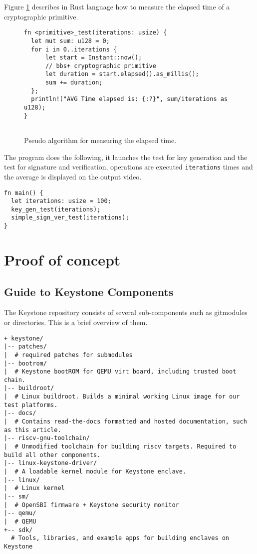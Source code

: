 Figure \ref{bbs-pseudo-algo} describes in Rust language how to measure the elapsed time of a cryptographic primitive. \\
\begin{figure}[H]
\begin{lstlisting}[frame=single]
fn <primitive>_test(iterations: usize) {
  let mut sum: u128 = 0;
  for i in 0..iterations {
      let start = Instant::now();
      // bbs+ cryptographic primitive
      let duration = start.elapsed().as_millis();
      sum += duration;
  };
  println!("AVG Time elapsed is: {:?}", sum/iterations as u128);
}
    
\end{lstlisting}
\caption{Pseudo algorithm for measuring the elapsed time.}
\label{bbs-pseudo-algo}
\end{figure}
The program does the following, it launches the test for key generation and the test for signature and verification, operations are executed \texttt{iterations} times and the average is displayed on the output video.  \\
\begin{lstlisting}[frame=single]
fn main() {
  let iterations: usize = 100;
  key_gen_test(iterations);
  simple_sign_ver_test(iterations);
}
\end{lstlisting}


\newpage
\section{Proof of concept}
\subsection{Guide to Keystone Components}
The Keystone repository consists of several sub-components such as gitmodules or directories. This is a brief overview of them. \\
\begin{lstlisting}[frame=single]
+ keystone/
|-- patches/
|  # required patches for submodules
|-- bootrom/
|  # Keystone bootROM for QEMU virt board, including trusted boot chain.
|-- buildroot/
|  # Linux buildroot. Builds a minimal working Linux image for our test platforms.
|-- docs/
|  # Contains read-the-docs formatted and hosted documentation, such as this article.
|-- riscv-gnu-toolchain/
|  # Unmodified toolchain for building riscv targets. Required to build all other components.
|-- linux-keystone-driver/
|  # A loadable kernel module for Keystone enclave.
|-- linux/
|  # Linux kernel
|-- sm/
|  # OpenSBI firmware + Keystone security monitor
|-- qemu/
|  # QEMU
+-- sdk/
  # Tools, libraries, and example apps for building enclaves on Keystone        
\end{lstlisting}
\newpage
